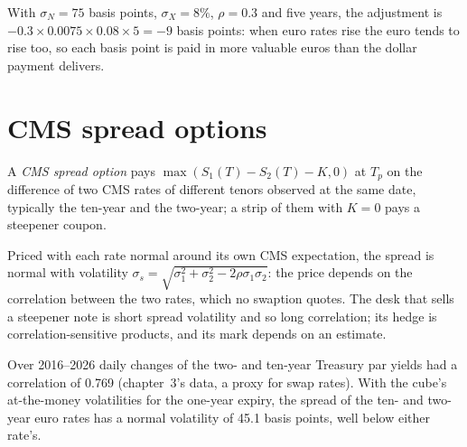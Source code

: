 \begin{example}\label{ex:rc:convexity-adjustments-and-constant-maturity-products:quanto}
With $\sigma_N = 75$ basis points, $\sigma_X = 8\%$, $\rho = 0.3$ and five years,
the adjustment is $-0.3\times0.0075\times0.08\times5 = -9$ basis points: when euro
rates rise the euro tends to rise too, so each basis point is paid in more
valuable euros than the dollar payment delivers.
\end{example}

\section{CMS spread options}

\begin{definition}\label{def:rc:convexity-adjustments-and-constant-maturity-products:spread}
A \emph{CMS spread option} pays $\max(S_1(T)-S_2(T)-K,0)$
at $T_p$ on the difference of two CMS rates of different tenors observed at the
same date, typically the ten-year and the two-year; a strip of them with
$K=0$ pays a steepener coupon.
\end{definition}

Priced with each rate normal around its own CMS expectation, the spread is
normal with volatility $\sigma_s = \sqrt{\sigma_1^2+\sigma_2^2-2\rho\sigma_1\sigma_2}$:
the price depends on the correlation between the two rates, which no swaption
quotes. The desk that sells a steepener note is short spread volatility and so
long correlation; its hedge is correlation-sensitive products, and its mark
depends on an estimate.

\begin{example}\label{ex:rc:convexity-adjustments-and-constant-maturity-products:spreadvol}
Over 2016--2026 daily changes of the two- and ten-year Treasury par yields had
a correlation of 0.769 (chapter~3's data, a proxy for swap rates). With the
cube's at-the-money volatilities for the one-year expiry, the spread of the
ten- and two-year euro rates has a normal volatility of 45.1 basis points, well
below either rate's.
\end{example}

